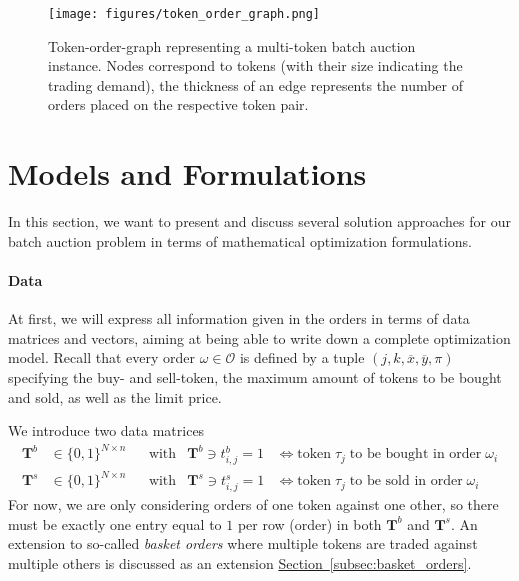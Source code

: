 \documentclass[11pt,parskip=full]{scrartcl}%
\newcommand*{\orders}{\mathcal{O}}          %
\newcommand*{\secref}[1]{\hyperref[{#1}]{Section~\ref*{#1}}}
\begin{document}
\begin{figure}[h!]
  \centering
  \texttt{[image: figures/token\_order\_graph.png]}
  \caption{Token-order-graph representing a multi-token batch auction instance. Nodes correspond
  to tokens (with their size indicating the trading demand), the thickness of an edge represents 
  the number of orders placed on the respective token pair.}
  \label{fig:order-token-graph}
\end{figure}


\clearpage
\section{Models and Formulations}
\label{sec:models}

In this section, we want to present and discuss several solution approaches for our batch auction
problem in terms of mathematical optimization formulations.

\vspace{-.2cm}
\paragraph{Data}

At first, we will express all information given in the orders in terms of data matrices and
vectors, aiming at being able to write down a complete optimization model.
Recall that every order $ \omega \in \orders $ is defined by a tuple
$ (j,k,\overline{x},\overline{y},\pi) $ specifying the buy- and sell-token, the maximum amount of
tokens to be bought and sold, as well as the limit price.

We introduce two data matrices
\begin{align*}
  \mathbf{T}^b &\in \{0,1\}^{N \times n} && \text{with} & \mathbf{T}^b \ni t^b_{i,j} = 1
  &\Leftrightarrow
  \text{token} \; \tau_j \; \text{to be bought in order} \; \omega_i \\
  \mathbf{T}^s &\in \{0,1\}^{N \times n} && \text{with} & \mathbf{T}^s \ni t^s_{i,j} = 1
  &\Leftrightarrow
  \text{token} \; \tau_j \; \text{to be sold in order} \; \omega_i
\end{align*}
For now, we are only considering orders of one token against one other, so there must be exactly
one entry equal to $ 1 $ per row (order) in both $ \mathbf{T}^b $ and $ \mathbf{T}^s $.
An extension to so-called \emph{basket orders} where multiple tokens are traded against multiple
others is discussed as an extension \secref{subsec:basket_orders}.
\end{document}
